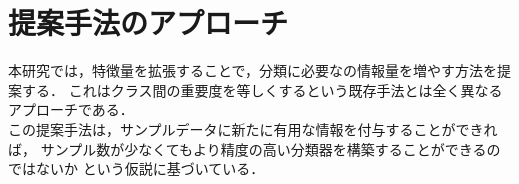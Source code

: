 \section{提案手法のアプローチ}

本研究では，特徴量を拡張することで，分類に必要なの情報量を増やす方法を提案する．
これはクラス間の重要度を等しくするという既存手法とは全く異なるアプローチである．\\
この提案手法は，サンプルデータに新たに有用な情報を付与することができれば，
サンプル数が少なくてもより精度の高い分類器を構築することができるのではないか
という仮説に基づいている．\\

